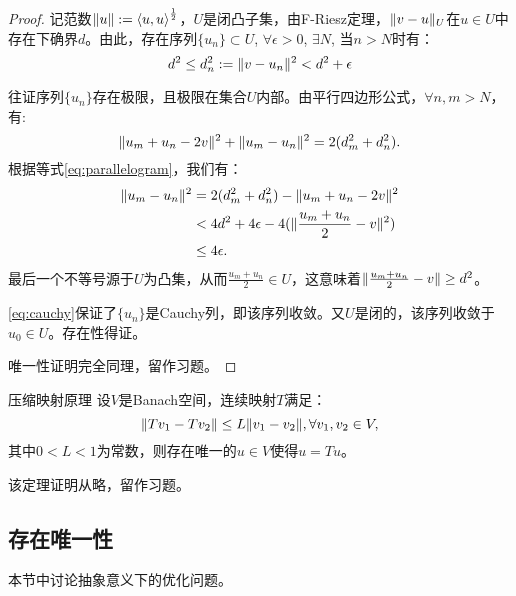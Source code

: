 \begin{proof}
  记范数$\|u\|:=\left<u,u\right>^{\frac{1}{2}}$，$U$是闭凸子集，由F-Riesz定理，$\|v-u\|_{U}$在$u\in U$中存在下确界$d$。由此，存在序列$\{u_{n}\}\subset U$, $\forall\epsilon>0$, $\exists N$, 当$n>N$时有：
  \begin{equation}
    \label{eq:cauchyseq}
    d^2\le d_{n}^{2}:=\|v-u_{n}\|^{2}<d^2+\epsilon
  \end{equation}

  往证序列$\{u_{n}\}$存在极限，且极限在集合$U$内部。由平行四边形公式，$\forall n,m>N$，有:
  \begin{equation}
    \label{eq:parallelogram}
    \|u_{m}+u_{n}-2v\|^{2}+\|u_{m}-u_{n}\|^{2}=2(d_{m}^{2}+d_{n}^{2}).
  \end{equation}
  根据等式\eqref{eq:parallelogram}，我们有：
  \begin{equation}
    \label{eq:cauchy}
    \begin{aligned}
      \|u_{m}-u_{n}\|^{2}&=2(d_{m}^2+d_{n}^2)-\|u_{m}+u_{n}-2v\|^2\\
      &< 4d^2+4\epsilon -4(\|\frac{u_{m}+u_{n}}{2}-v\|^2)\\
      &\le 4\epsilon.
    \end{aligned}
  \end{equation}
  最后一个不等号源于$U$为凸集，从而$\frac{u_{m}+u_{n}}{2}\in U$，这意味着$\|\frac{u_{m}+u_{n}}{2}-v\|\ge d^2$。

  \eqref{eq:cauchy}保证了$\{u_{n}\}$是Cauchy列，即该序列收敛。又$U$是闭的，该序列收敛于$u_{0}\in U$。存在性得证。

  唯一性证明完全同理，留作习题。
\end{proof}
\begin{proposition}{压缩映射原理}
  设$V$是Banach空间，连续映射$T$满足：
  \begin{equation}
    \|Tv_{1}-Tv_{2}\|\le L\|v_{1}-v_{2}\|,\forall v_{1},v_{2}\in V,
  \end{equation}
  其中$0<L<1$为常数，则存在唯一的$u\in V$使得$u=Tu$。
\end{proposition}
该定理证明从略，留作习题。
\subsection{存在唯一性}
本节中讨论抽象意义下的优化问题。

